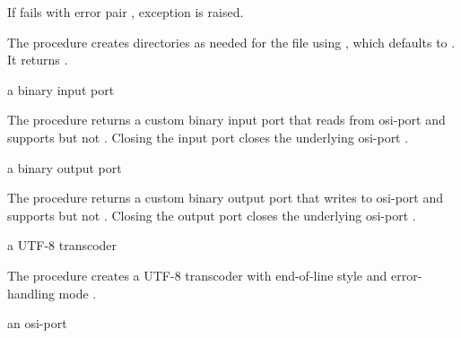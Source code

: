 If  fails with error pair , exception  is raised.

\begin{procedure}
\end{procedure}
\returns{} 

The  procedure creates directories as needed
for the file  using , which defaults to
. It returns .

\begin{procedure}
\end{procedure}
\returns{} a binary input port

The  procedure returns a custom binary input
port that reads from osi-port  and supports
 but not . Closing the
input port closes the underlying osi-port .

\begin{procedure}
\end{procedure}
\returns{} a binary output port

The  procedure returns a custom binary
output port that writes to osi-port  and supports
 but not . Closing the
output port closes the underlying osi-port .

\begin{procedure}
\end{procedure}
\returns{} a UTF-8 transcoder

The  procedure creates a UTF-8 transcoder
with end-of-line style  and error-handling mode
.

\begin{procedure}
\end{procedure}
\returns{} an osi-port

